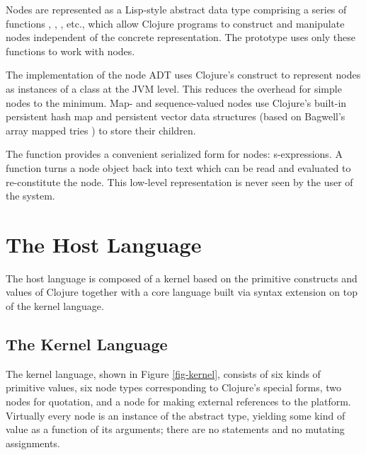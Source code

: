 Nodes are represented as a Lisp-style abstract data type comprising a series of functions , , , etc., which allow Clojure programs to construct and manipulate nodes independent of the concrete representation. The prototype uses only these functions to work with nodes.

The implementation of the node ADT uses Clojure's  construct to represent nodes as instances of a  class at the JVM level. This reduces the overhead for simple nodes to the minimum. Map- and sequence-valued nodes use Clojure's built-in persistent hash map and persistent vector data structures (based on Bagwell's array mapped tries \cite{bagwell}) to store their children.

The  function provides a convenient serialized form for nodes: s-expressions. A  function turns a node object back into text which can be read and evaluated to re-constitute the node. This low-level representation is never seen by the user of the system.


\section{The Host Language}
\label{host}
The host language is composed of a kernel based on the primitive constructs and values of Clojure together with a core language built via syntax extension on top of the kernel language.

\subsection{The Kernel Language}
The kernel language, shown in Figure \ref{fig-kernel}, consists of six kinds of primitive values, six node types corresponding to Clojure's special forms, two nodes for quotation, and a node for making external references to the platform. Virtually every node is an instance of the abstract  type, yielding some kind of value as a function of its arguments; there are no statements and no mutating assignments.


